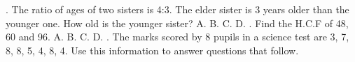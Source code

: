 \documentclass{article}
\begin{document}
\begin{multicols}{2}
\newline{}. The ratio of ages of two sisters is 4:3. The elder sister is 3 years older than the younger one. How old is the younger sister? \newline \indent A. \newline \indent B. \newline \indent C. \newline \indent D.  \newline{}.  Find the H.C.F of 48, 60 and 96. \newline \indent A. \newline \indent B. \newline \indent C. \newline \indent D.  \newline{}. The marks scored by 8 pupils in a science test are 3, 7, 8, 8, 5, 4, 8, 4. Use this information to answer questions that follow.

\end{multicols}
\end{document}
